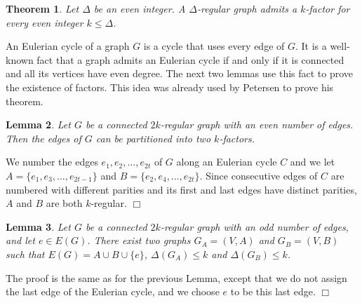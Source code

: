 \documentclass[11pt]{article}
\newtheorem{lemma}{Lemma}[section]
\newtheorem{theorem}[lemma]{Theorem}
\newcounter{claim}
\newenvironment{proof}[1][]%
 {\noindent {\setcounter{claim}{0}\sc proof ---
   }{#1}{}}{\hfill$\Box$\vspace{2ex}}
\begin{document}
\begin{theorem}\cite{P91}\label{thm:petersen}
Let $\Delta$ be an even integer. A $\Delta$-regular graph admits a $k$-factor for every even integer $k \leq \Delta$. 
\end{theorem}

An Eulerian cycle of a graph $G$ is a cycle that uses every edge of $G$. It is a well-known fact that a graph admits an Eulerian cycle if and only if it is connected and all its vertices have even degree. 
The next two lemmas use this fact to prove the existence of factors. This idea was already used by Petersen to prove his theorem. 

\begin{lemma}\label{lem:delta_even_kV_even}
Let $G$ be a connected $2k$-regular graph with an even number of edges. Then the edges of $G$ can be partitioned into two $k$-factors. 
\end{lemma}

\begin{proof}
We number the edges $e_1, e_2, \dots, e_{2t}$ of $G$ along an Eulerian cycle $C$ and we let $A= \{e_1, e_3, \dots, e_{2t-1}\}$ and $B = \{e_2, e_4, \dots, e_{2t}\}$. 
Since consecutive edges of $C$ are numbered with different parities and its first and last edges  have distinct parities, $A$ and $B$ are both $k$-regular. 
\end{proof}



 

\begin{lemma}\label{lem:delta_even_kV_odd}
Let $G$ be a connected $2k$-regular graph with an odd number of edges, and let $e \in E(G)$. There exist two graphs $G_{A} = (V,A)$ and $G_{B} = (V,B)$ such that $E(G) = A \cup B \cup \{e\}$, $\Delta(G_{A}) \leq k$ and $\Delta(G_{B}) \leq k$.
\end{lemma}

\begin{proof}
The proof is the same as for the previous Lemma, except that we do not assign the last edge of the Eulerian cycle, and we choose $e$ to be this last edge. 
\end{proof}
\end{document}
